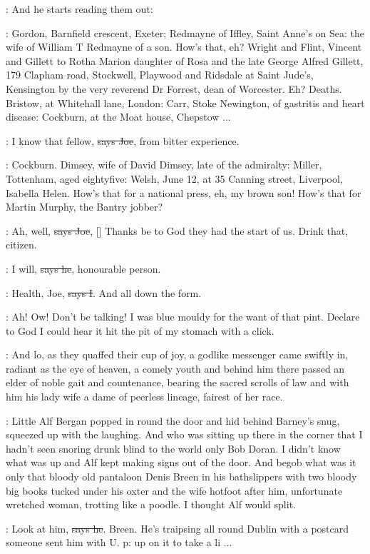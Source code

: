 \Nq:
And he starts reading them out:

\citizen:
Gordon, Barnfield crescent, Exeter;
Redmayne of Iffley, Saint Anne's on
Sea: the wife of William T Redmayne of a son. How's that, eh? Wright and
Flint, Vincent and Gillett to Rotha Marion daughter of Rosa and the late
George Alfred Gillett, 179 Clapham road, Stockwell, Playwood and
Ridsdale at Saint Jude's, Kensington by the very reverend Dr Forrest, dean
of Worcester. Eh? Deaths. Bristow, at Whitehall lane, London: Carr, Stoke
Newington, of gastritis and heart disease: Cockburn, at the Moat house,
Chepstow ...

\joe:
I know that fellow, \sout{says Joe},
from bitter experience.

\citizen:
Cockburn. Dimsey, wife of David Dimsey,
late of the admiralty: Miller,
Tottenham, aged eightyfive: Welsh, June 12, at 35 Canning street,
Liverpool, Isabella Helen. How's that for a national press, eh, my brown
son! How's that for Martin Murphy, the Bantry jobber?

\joe:
Ah, well, \sout{says Joe},
[]
Thanks be to God they had
the start of us. Drink that, citizen.

\citizen:
I will, \sout{says he}, honourable person.

:
Health, Joe, \sout{says I}. And all down the form.

\Nq:
Ah! Ow! Don't be talking! I was blue mouldy for the want of that
pint. Declare to God I could hear it hit the pit of my stomach with a
click.

:
And lo, as they quaffed their cup of joy, a godlike messenger came
swiftly in, radiant as the eye of heaven, a comely youth and behind him
there passed an elder of noble gait and countenance, bearing the sacred
scrolls of law and with him his lady wife a dame of peerless lineage,
fairest of her race.

\Nq:
Little Alf Bergan popped in round the door and hid behind Barney's
snug, squeezed up with the laughing. And who was sitting up there in the
corner that I hadn't seen snoring drunk blind to the world only Bob Doran.
I didn't know what was up and Alf kept making signs out of the door. And
begob what was it only that bloody old pantaloon Denis Breen in his
bathslippers with two bloody big books tucked under his oxter and the wife
hotfoot after him, unfortunate wretched woman, trotting like a poodle. I
thought Alf would split.

\bergan:
Look at him, \sout{says he}. Breen.
He's traipsing all round Dublin with a
postcard someone sent him with U. p: up on it to take a li ...

